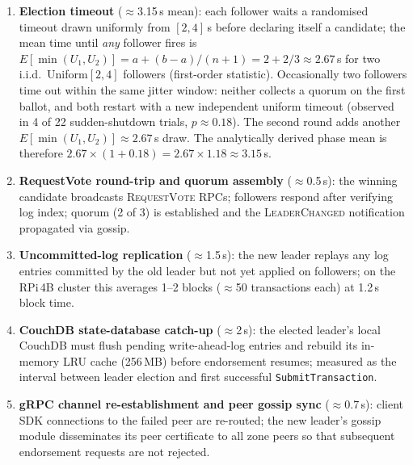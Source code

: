 \documentclass[pdflatex,sn-mathphys-num]{sn-jnl}
\theoremstyle{thmstyleone}
\theoremstyle{thmstyletwo}
\theoremstyle{thmstylethree}
\begin{document}
\begin{enumerate}
  \item \textbf{Election timeout} ($\approx$3.15\,s mean): each follower waits a randomised timeout drawn uniformly from $[2,4]$\,s before declaring itself a candidate; the mean time until \emph{any} follower fires is $E[\min(U_1,U_2)] = a + (b-a)/(n+1) = 2 + 2/3 \approx 2.67$\,s for two i.i.d.\ Uniform$[2,4]$ followers (first-order statistic). Occasionally two followers time out within the same jitter window: neither collects a quorum on the first ballot, and both restart with a new independent uniform timeout (observed in 4 of 22 sudden-shutdown trials, $p \approx 0.18$). The second round adds another $E[\min(U_1,U_2)] \approx 2.67$\,s draw. The analytically derived phase mean is therefore $2.67 \times (1 + 0.18) = 2.67 \times 1.18 \approx 3.15$\,s.
  \item \textbf{RequestVote round-trip and quorum assembly} ($\approx$0.5\,s): the winning candidate broadcasts \textsc{RequestVote} RPCs; followers respond after verifying log index; quorum (2 of 3) is established and the \textsc{LeaderChanged} notification propagated via gossip.
  \item \textbf{Uncommitted-log replication} ($\approx$1.5\,s): the new leader replays any log entries committed by the old leader but not yet applied on followers; on the RPi\,4B cluster this averages 1–2 blocks ($\approx$50 transactions each) at 1.2\,s block time.
  \item \textbf{CouchDB state-database catch-up} ($\approx$2\,s): the elected leader's local CouchDB must flush pending write-ahead-log entries and rebuild its in-memory LRU cache (256\,MB) before endorsement resumes; measured as the interval between leader election and first successful \texttt{SubmitTransaction}.
  \item \textbf{gRPC channel re-establishment and peer gossip sync} ($\approx$0.7\,s): client SDK connections to the failed peer are re-routed; the new leader's gossip module disseminates its peer certificate to all zone peers so that subsequent endorsement requests are not rejected.
\end{enumerate}
\end{document}
